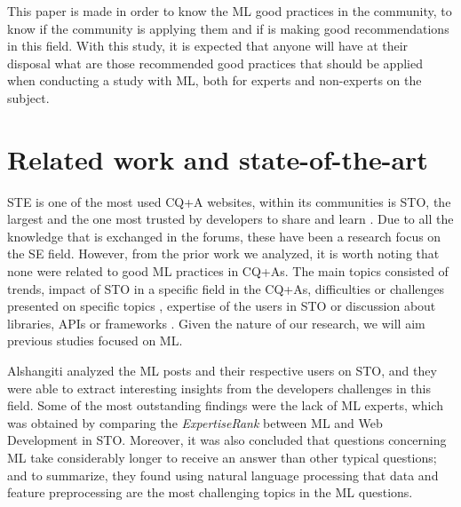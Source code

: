 \documentclass[conference]{IEEEtran}
\begin{document}
This paper is made in order to know the \ac{ML} good practices in the  community, to know if the community is applying them and if  is making good recommendations in this field. With this study, it is expected that anyone will have at their disposal what are those recommended good practices that should be applied when conducting a study with \ac{ML}, both for experts and non-experts on the subject.

\section{Related work and state-of-the-art}

\ac{STE} is one of the most used \ac{CQ+A} websites, within its communities is \ac{STO}, the largest and the one most trusted by developers to share and learn \cite{stackexchange_2021}. Due to all the knowledge that is exchanged in the forums, these have been a research focus on the \ac{SE} field. However, from the prior work we analyzed, it is worth noting that none were related to good \ac{ML} practices in \acp{CQ+A}. The main topics consisted of trends, impact of \ac{STO}  in a specific field  \cite{Meldrum_17, Treude_2011, barua_what_2014, Bangash_2019} in the \acp{CQ+A},  difficulties or challenges presented on specific topics \cite{Alshangiti_2019, Kochhar_2016, Islam_2019},  expertise of the users  in \ac{STO} \cite{Alshangiti_2019, Yang_2014, Vadlamani_2020}  or discussion  about libraries, APIs or frameworks \cite{Islam_2019, Ahasanuzzaman_2020, Han_2020, Hashemi_2020}. Given the nature of our research, we will aim previous studies focused on \ac{ML}.

Alshangiti \etal  \cite{Alshangiti_2019}  analyzed the \ac{ML} posts and their respective users on \ac{STO}, and they were able to extract interesting insights from the developers challenges in this field. Some of the most outstanding findings were the lack of \ac{ML} experts, which was obtained by comparing the \textit{ExpertiseRank} between \ac{ML} and Web Development in \ac{STO}. Moreover, it was also concluded that questions concerning ML take considerably longer to receive an answer than other typical questions; and to summarize, they found using natural language processing that data and feature preprocessing are the most challenging topics in the \ac{ML} questions.
\end{document}

